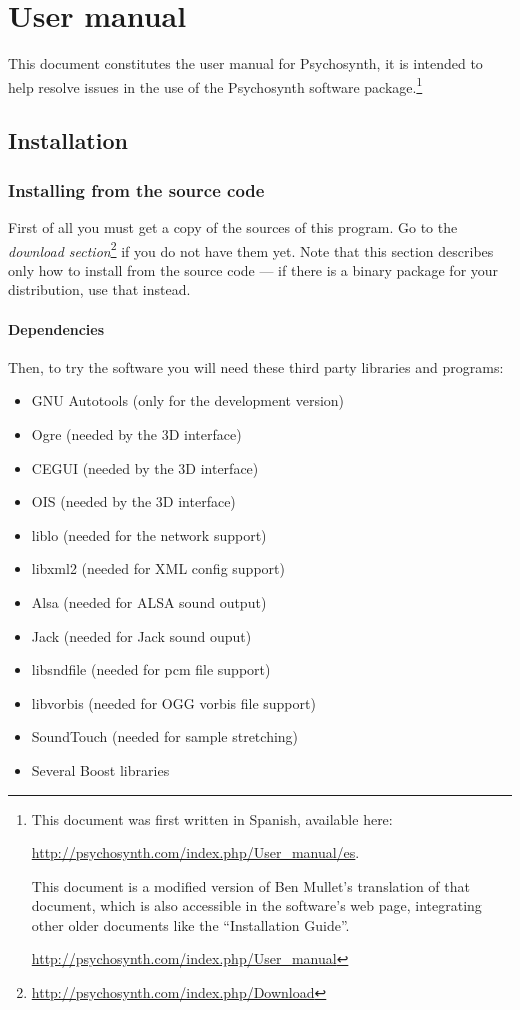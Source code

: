 
\chapter{User manual}

This document constitutes the user manual for Psychosynth, it is
intended to help resolve issues in the use of the Psychosynth software
package.\footnote{This document was first written in Spanish,
  available here:

  \url{http://psychosynth.com/index.php/User_manual/es}. 

  This document is a modified version of Ben Mullet's translation of
  that document, which is also accessible in the software's web page,
  integrating other older documents like the ``Installation Guide''.

\url{http://psychosynth.com/index.php/User_manual}}

\section{Installation}

\subsection{Installing from the source code}

First of all you must get a copy of the sources of this program. Go to
the \emph{download
  section}\footnote{\url{http://psychosynth.com/index.php/Download}}
if you do not have them yet. Note that this section describes only how
to install from the source code --- if there is a binary package for
your distribution, use that instead.

\subsubsection{Dependencies}

Then, to try the software you will need these third party libraries
and programs:

\begin{itemize}
\item GNU Autotools (only for the development version) 
\item Ogre (needed by
  the 3D interface)
\item CEGUI (needed by the 3D interface)
\item OIS (needed by the 3D interface)
\item liblo (needed for the network support)
\item libxml2 (needed for XML config support)
\item Alsa (needed for ALSA sound output)
\item Jack (needed for Jack sound ouput) 
\item libsndfile (needed for
  pcm file support) 
\item libvorbis (needed for OGG vorbis file support)
\item SoundTouch (needed for sample stretching)
\item Several Boost libraries
\end{itemize}

